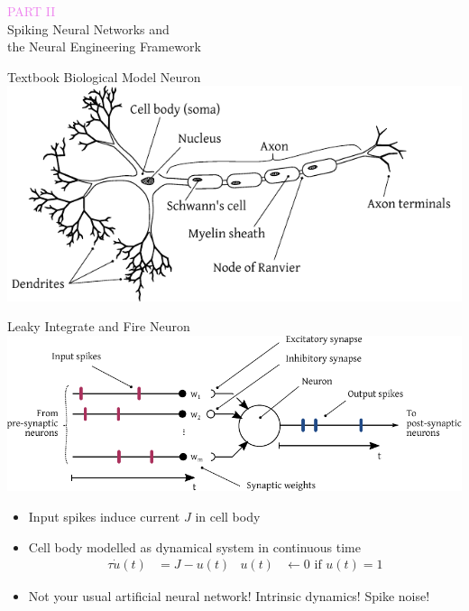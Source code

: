 \documentclass[aspectratio=169]{beamer}
\begin{document}


\begin{frame}
	\centering
	{\Large\textcolor{violet}{\textsc{PART II}}}\\
	\huge Spiking Neural Networks and\\the Neural Engineering Framework
\end{frame}

\begin{frame}{Textbook Biological Model Neuron}
	\centering
	\includegraphics{media/neuron_sketch.pdf}\\
\end{frame}

\begin{frame}{Leaky Integrate and Fire Neuron}
	\centering
	\includegraphics[scale=0.9]{media/spiking_neuron.pdf}
	\begin{itemize}
		\item Input spikes induce current $J$ in cell body
		\item Cell body modelled as dynamical system in continuous time
		\begin{align*}
			\tau \dot u(t) &= J - u(t) & u(t) &\gets 0 \text{ if } u(t) = 1
		\end{align*}
		\item<2->[\symbolfont{⚠}] Not your usual artificial neural network! Intrinsic dynamics! Spike noise!
	\end{itemize}
\end{frame}
\end{document}
